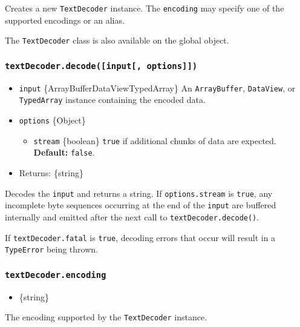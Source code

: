Creates a new \texttt{TextDecoder} instance. The \texttt{encoding} may
specify one of the supported encodings or an alias.

The \texttt{TextDecoder} class is also available on the global object.

\subsubsection{\texorpdfstring{\texttt{textDecoder.decode({[}input{[},\ options{]}{]})}}{textDecoder.decode({[}input{[}, options{]}{]})}}\label{textdecoder.decodeinput-options}

\begin{itemize}
\tightlist
\item
  \texttt{input} \{ArrayBuffer\textbar DataView\textbar TypedArray\} An
  \texttt{ArrayBuffer}, \texttt{DataView}, or \texttt{TypedArray}
  instance containing the encoded data.
\item
  \texttt{options} \{Object\}

  \begin{itemize}
  \tightlist
  \item
    \texttt{stream} \{boolean\} \texttt{true} if additional chunks of
    data are expected. \textbf{Default:} \texttt{false}.
  \end{itemize}
\item
  Returns: \{string\}
\end{itemize}

Decodes the \texttt{input} and returns a string. If
\texttt{options.stream} is \texttt{true}, any incomplete byte sequences
occurring at the end of the \texttt{input} are buffered internally and
emitted after the next call to \texttt{textDecoder.decode()}.

If \texttt{textDecoder.fatal} is \texttt{true}, decoding errors that
occur will result in a \texttt{TypeError} being thrown.

\subsubsection{\texorpdfstring{\texttt{textDecoder.encoding}}{textDecoder.encoding}}\label{textdecoder.encoding}

\begin{itemize}
\tightlist
\item
  \{string\}
\end{itemize}

The encoding supported by the \texttt{TextDecoder} instance.

